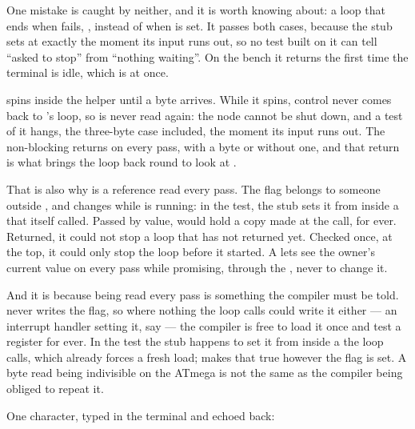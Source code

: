One mistake is caught by neither, and it is worth knowing about: a loop that ends when
 fails, , instead of when  is set. It passes
both cases, because the stub sets  at exactly the moment its input runs out, so no test
built on it can tell ``asked to stop'' from ``nothing waiting''. On the bench it returns the first
time the terminal is idle, which is at once.

  spins inside the helper until a byte arrives. While it spins, control
never comes back to 's loop, so  is never read again: the node cannot be shut
down, and a test of it hangs, the three-byte case included, the moment its input runs out. The
non-blocking  returns on every pass, with a byte or without one, and that return is
what brings the loop back round to look at .

That is also why  is a reference read every pass. The flag belongs to someone outside
, and changes while  is running: in the test, the stub sets it from inside a
 that  itself called. Passed by value,  would hold a copy made
at the call,  for ever. Returned, it could not stop a loop that has not returned yet.
Checked once, at the top, it could only stop the loop before it started. A  lets  see the owner's current value on every pass while promising, through the
, never to change it.

And it is  because being read every pass is something the compiler must be told.
 never writes the flag, so where nothing the loop calls could write it either --- an
interrupt handler setting it, say --- the compiler is free to load it once and test a register for
ever. In the test the stub happens to set it from inside a  the loop calls, which
already forces a fresh load;  makes that true however the flag is set. A byte read
being indivisible on the ATmega is not the same as the compiler being obliged to repeat it.

One character, typed in the terminal and echoed back:

